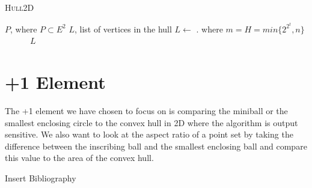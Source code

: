 \documentclass[12pt]{article}
\begin{document}
\begin{algorithm}\caption{\textsc{Hull2D}}\label{alg:hull2d}
\begin{algorithmic}[2]
 $P$, where $P \subset E^2$
 $L$, list of vertices in the hull
\State $L \gets$ . where $m=H=min\{2^{2^t}, n \}$
\\
~~~~~~\Return $L$
\EndIf
\EndFor
\end{algorithmic}
\end{algorithm}

\section*{+1 Element}
The +1 element we have chosen to focus on is comparing the miniball or the smallest enclosing circle to the convex hull in 2D where the algorithm is output sensitive. We also want to look at the aspect ratio of a point set by taking the difference between the inscribing ball and the smallest enclosing ball and compare this value to the area of the convex hull. 

Insert Bibliography
\end{document}
